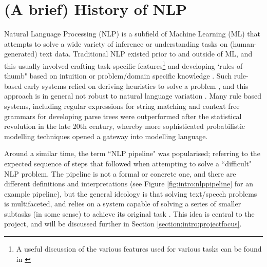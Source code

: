 \section{(A brief) History of NLP} \label{section:intro:history}
Natural Language Processing (NLP) is a subfield of Machine Learning (ML) that attempts to solve a wide variety of inference or understanding tasks on (human-generated) text data. Traditional NLP existed prior to and outside of ML, and this usually involved crafting task-specific features\footnote{A useful discussion of the various features used for various tasks can be found in \cite{Collobert}} and developing `rules-of-thumb" based on intuition or problem/domain specific knowledge \cite{Kang2013}. Such rule-based early systems relied on deriving heuristics to solve a problem \cite{Brill}, and this approach is in general not robust to natural language variation \cite{Chiticariu2013}. Many rule based systems, including regular expressions for string matching \cite{Kaur2014} and context free grammars for developing parse trees \cite{Nederhof} were outperformed after the statistical revolution in the late 20th century, whereby more sophisticated probabilistic modelling techniques opened a gateway into modelling language. 

Around a similar time, the term ``NLP pipeline" was popularised; referring to the expected sequence of steps that followed when attempting to solve a ``difficult" NLP problem. The pipeline is not a formal or concrete one, and there are different definitions and interpretations (see Figure \ref{fig:intro:nlppipeline} for an example pipeline), but the general ideology is that solving text/speech problems is multifaceted, and relies on a system capable of solving a series of smaller subtasks (in some sense) to achieve its original task \cite{Tenney2019a}. This idea is central to the project, and will be discussed further in Section \ref{section:intro:projectfocus}.

